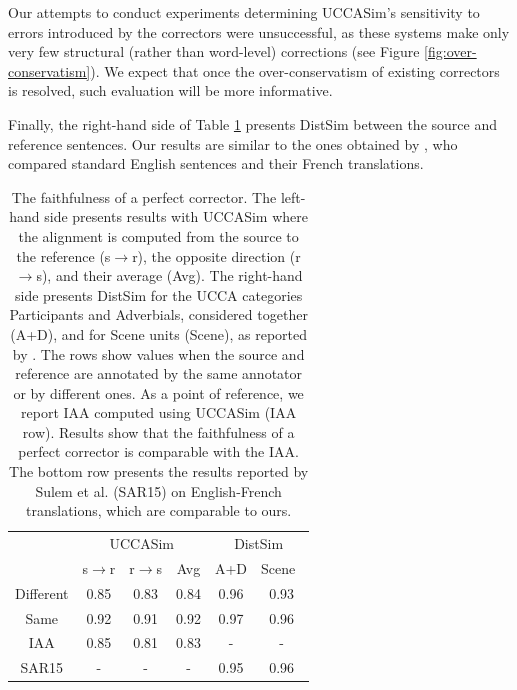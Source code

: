 \documentclass[letter,11pt]{article}
\begin{document}
Our attempts to conduct experiments determining {\sc UCCASim}'s sensitivity to
errors introduced by the correctors were
unsuccessful, as these systems make only very few structural (rather than word-level)
corrections (see Figure \ref{fig:over-conservatism}).
We expect that once the over-conservatism of existing correctors is resolved,
such evaluation will be more informative.
%

Finally, the right-hand side of Table \ref{tab:Distances} presents {\sc DistSim}
between the source and reference sentences.
Our results are similar to the ones obtained by ,
who compared standard English sentences and their French translations.
\begin{table}[h!]
	\vspace{-0.5cm}
  \small
  \centering
  \singlespacing
  \begin{tabular}{c|c|c|c||c|c|}
  	\cline{2-6} 
  	& \multicolumn{3}{c||}{\sc UCCASim} & \multicolumn{2}{c|}{\sc DistSim}\\ \cline{2-6}
  	& s$\rightarrow$r & r$\rightarrow$s & Avg & A+D & Scene\
    \\
    \hline
    Different & 0.85 & 0.83 & 0.84 & 0.96 & 0.93
    \\
    Same & 0.92 & 0.91 & 0.92 & 0.97 & 0.96
    \\
    \hline
    \hline
    IAA & 0.85 & 0.81 & 0.83 & - & -
    \\
    \hline
    SAR15 & - & - & - & 0.95 & 0.96 \\
    \hline
  \end{tabular}
  \caption{\label{tab:Distances}
    The faithfulness of a perfect corrector. The left-hand side presents results with {\sc UCCASim}
    where the alignment is computed from the source to the reference (s$\rightarrow$r), the opposite direction
    (r$\rightarrow$s), and their average (Avg).
    The right-hand side presents {\sc DistSim} for the UCCA categories Participants and Adverbials, considered
    together (A+D), and for Scene units (Scene), as reported by \newcite{sulem2015conceptual}.
    The rows show values when the source and reference are annotated by the same annotator
    or by different ones. As a point of reference, we report IAA computed using {\sc UCCASim} (IAA row).
    Results show that the faithfulness of a perfect corrector is comparable with the IAA.
    The bottom row presents the results reported by Sulem et al. (SAR15) on English-French
    translations, which are comparable to ours.}
\vspace{-0.6cm}
\end{table}
\end{document}
